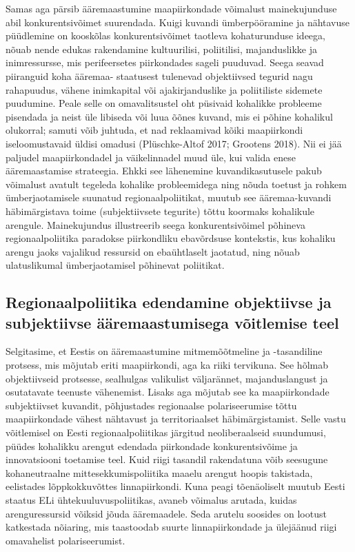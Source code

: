 \documentclass[]{book}
\begin{document}
Samas aga pärsib ääremaastumine maapiirkondade võimalust mainekujunduse abil konkurentsivõimet
suurendada. Kuigi kuvandi ümberpööramine ja nähtavuse püüdlemine on kooskõlas konkurentsivõimet
taotleva kohaturunduse ideega, nõuab nende edukas rakendamine kultuurilisi, poliitilisi, majanduslikke ja
inimressursse, mis perifeersetes piirkondades sageli puuduvad. Seega seavad piiranguid koha ääremaa-
staatusest tulenevad objektiivsed tegurid nagu rahapuudus, vähene inimkapital või ajakirjanduslike ja
poliitiliste sidemete puudumine. Peale selle on omavalitsustel oht püsivaid kohalikke probleeme pisendada
ja neist üle libiseda või luua õõnes kuvand, mis ei põhine kohalikul olukorral; samuti võib juhtuda, et nad
reklaamivad kõiki maapiirkondi iseloomustavaid üldisi omadusi (Plüschke-Altof 2017; Grootens 2018). Nii ei
jää paljudel maapiirkondadel ja väikelinnadel muud üle, kui valida enese ääremaastamise strateegia. Ehkki
see lähenemine kuvandikasutusele pakub võimalust avatult tegeleda kohalike probleemidega ning nõuda toetust ja rohkem ümberjaotamisele suunatud regionaalpoliitikat, muutub see ääremaa-kuvandi häbimärgistava toime (subjektiivsete tegurite) tõttu koormaks kohalikule arengule. Mainekujundus illustreerib seega konkurentsivõimel põhineva regionaalpoliitika paradokse piirkondliku ebavõrdsuse
kontekstis, kus kohaliku arengu jaoks vajalikud ressursid on ebaühtlaselt jaotatud, ning nõuab ulatuslikumal
ümberjaotamisel põhinevat poliitikat.

\hypertarget{regionaalpoliitika-edendamine-objektiivse-ja-subjektiivse-aaremaastumisega-voitlemise-teel}{%
\subsection{Regionaalpoliitika edendamine objektiivse ja subjektiivse ääremaastumisega võitlemise teel}\label{regionaalpoliitika-edendamine-objektiivse-ja-subjektiivse-aaremaastumisega-voitlemise-teel}}

Selgitasime, et Eestis on ääremaastumine mitmemõõtmeline ja -tasandiline protsess, mis mõjutab eriti maapiirkondi, aga ka riiki tervikuna. See hõlmab objektiivseid protsesse, sealhulgas valikulist väljarännet, majanduslangust ja osutatavate teenuste vähenemist. Lisaks aga mõjutab see ka maapiirkondade subjektiivset kuvandit, põhjustades regionaalse polariseerumise tõttu maapiirkondade vähest nähtavust ja territoriaalset häbimärgistamist. Selle vastu võitlemisel on Eesti regionaalpoliitikas järgitud neoliberaalseid suundumusi, püüdes kohalikku arengut edendada piirkondade konkurentsivõime ja innovatsiooni toetamise teel. Kuid riigi tasandil rakendatuna võib seesugune kohaneutraalne mittesekkumispoliitika maaelu arengut hoopis takistada, eelistades lõppkokkuvõttes linnapiirkondi. Kuna peagi tõenäoliselt muutub Eesti staatus ELi ühtekuuluvuspoliitikas, avaneb võimalus arutada, kuidas arenguressursid võiksid jõuda ääremaadele. Seda arutelu soosides on lootust katkestada nõiaring, mis taastoodab suurte linnapiirkondade ja ülejäänud riigi omavahelist polariseerumist.
\end{document}
